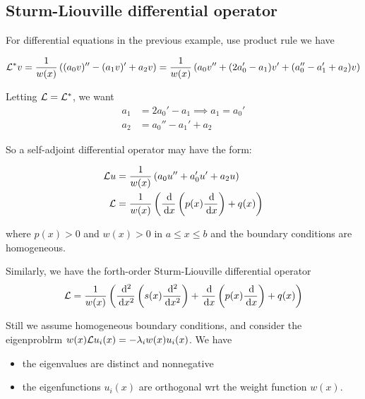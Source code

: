 \documentclass{article}
\begin{document}
\subsection{Sturm-Liouville differential operator}

For differential equations in the previous example, use product rule we have

\[\mathcal{L}^* v=\frac{1}{w(x)}\left( (a_0v)''-(a_1v)'+a_2v \right)=\frac{1}{w(x)}\left( a_0v''+(2a_0'-a_1)v'+(a_0''-a_1'+a_2)v \right)\]

Letting \(\mathcal{L}=\mathcal{L}^*\), we want
\begin{align*}
    a_1 &= 2a_0'-a_1 \implies a_1 = a_0'\\
    a_2 &= a_0''-a_1'+a_2
\end{align*}

So a self-adjoint differential operator may have the form:

\begin{align*}
    \mathcal{L} u &= \frac{1}{w(x)} \left( a_0u''+a_0'u'+a_2u \right)\\
    \mathcal{L} &= \frac{1}{w(x)} \left( \frac{\,\mathrm{d}}{\,\mathrm{d} x}\left( p(x)\frac{\,\mathrm{d}}{\,\mathrm{d} x} \right)+q(x) \right)
\end{align*}

where \(p(x)>0\) and \(w(x)>0\) in \(a\leq x\leq b\) and the boundary conditions are homogeneous.
\begin{remark}
    Similarly, we have the forth-order Sturm-Liouville differential operator
    \[\mathcal{L} = \frac{1}{w(x)}\left( \frac{\,\mathrm{d}^2}{\,\mathrm{d} x^2}\left( s(x)\frac{\,\mathrm{d}^2}{\,\mathrm{d} x^2} \right) +\frac{\,\mathrm{d}}{\,\mathrm{d} x}\left( p(x)\frac{\,\mathrm{d}}{\,\mathrm{d} x} \right)+q(x)  \right)\]
\end{remark}

\begin{remark}
    Still we assume homogeneous boundary conditions, and consider the eigenproblrm \(w(x)\mathcal{L} u_i(x)=-\lambda_i w(x) u_i(x)\). We have
    \begin{itemize}
        \item the eigenvalues are distinct and nonnegative
        \item the eigenfunctions \(u_i(x)\) are orthogonal wrt the weight function \(w(x)\).
    \end{itemize}
\end{remark}
\end{document}
